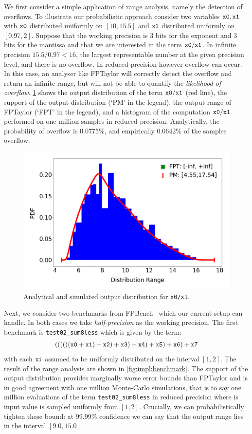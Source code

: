 \documentclass[10pt,conference]{IEEEtran}
\begin{document}
We first consider a simple application of range analysis, namely the detection of overflows. To illustrate our probabilistic approach consider two variables $\tt x0, x1$ with $\tt x0$ distributed uniformly on $\left[10, 15.5\right]$ and $\tt x1$ distributed uniformly on $\left[0.97,2\right]$. Suppose that the working precision is 3 bits for the exponent and 3 bits for the mantissa and that we are interested in the term $\tt x0/x1$. In infinite precision $15.5/0.97 < 16$, the largest representable number at the given precision level, and there is no overflow. In reduced precision however overflow can occur. In this case, an analyser like FPTaylor will correctly detect the overflow and return an infinite range, but will not be able to quantify the \emph{likelihood of overflow}. \cref{fig:impl:div} shows the output distribution of the term $\tt x0/x1$ (red line), the support of the output distribution (`PM' in the legend), the output range of FPTaylor (`FPT' in the legend), and a histogram of the computation $\tt x0/x1$ performed on one million samples in reduced precision. Analytically, the probability of overflow is 0.0775\%, and empirically 0.0642\% of the samples overflow.

\begin{figure}[h!]
\includegraphics[scale=0.22]{pics/range_dist_div}
\caption{Analytical and simulated output distribution for \texttt{x0/x1}.}
\label{fig:impl:div}
\end{figure}

Next, we consider two benchmarks from FPBench~\cite{fpbench} which our current setup can handle. In both cases we take \emph{half-precision} as the working precision. The first benchmark is \texttt{test02\_sum8less} which is given by the term: 
\[
\tt{((((((x0 + x1) + x2) + x3) + x4) + x5) + x6) + x7}
\]
with each $\tt xi$ assumed to be uniformly distributed on the interval $\left[1,2\right]$. The result of the range analysis are shown in \cref{fig:impl:benchmark}. The support of the output distribution provides marginally worse error bounds than FPTaylor and is in good agreement with one million Monte-Carlo simulations, that is to say one million evaluations of the term \texttt{test02\_sum8less} in reduced precision where is input value is sampled uniformly from $\left[1,2\right]$. Crucially, we can probabilistically tighten these bound: at 99.99\% confidence we can say that the output range lies in the interval $\left [9.0,15.0\right]$.
\end{document}
